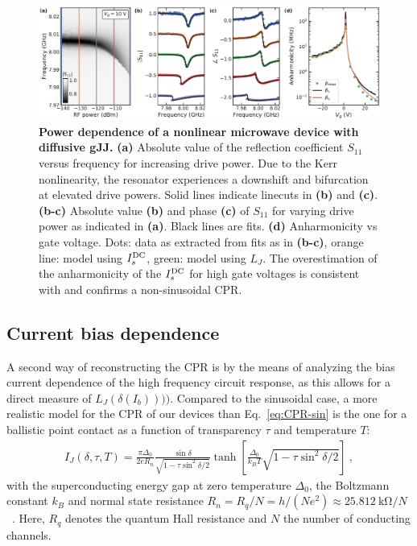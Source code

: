 \begin{figure}
	\centering
	\includegraphics[width=\linewidth]{chapter-gJJ-CPR/figs/Figure4}
	\caption{
		\textbf{Power dependence of a nonlinear microwave device with diffusive gJJ.}
		\textbf{(a)} Absolute value of the reflection coefficient $S_{11}$ versus frequency for increasing drive power.
		Due to the Kerr nonlinearity, the resonator experiences a downshift and bifurcation at elevated drive powers.
		Solid lines indicate linecuts in \textbf{(b)} and \textbf{(c)}.
		\textbf{(b-c)} Absolute value \textbf{(b)} and phase \textbf{(c)} of $S_{11}$ for varying drive power as indicated in \textbf{(a)}.
		Black lines are fits.
		\textbf{(d)} Anharmonicity vs gate voltage.
		Dots: data as extracted from fits as in \textbf{(b-c)}, orange line: model using $I_s^{\rm DC}$, green: model using $L_J$.
		The overestimation of the anharmonicity of the $I_s^{\rm DC}$ for high gate voltages is consistent with and confirms a non-sinusoidal CPR.
	}
	\label{fig:figure4}
\end{figure}

\subsection{Current bias dependence}

A second way of reconstructing the CPR is by the means of analyzing the bias current dependence of the high frequency circuit response, as this allows for a direct measure of $L_J(\delta(I_b))))$.
%
Compared to the sinusoidal case, a more realistic model for the CPR of our devices than Eq.~\ref{eq:CPR-sin} is the one for a ballistic point contact as a function of transparency $\tau$ and temperature $T$:
%
\begin{align}
I_J(\delta,\tau,T) = \frac{\pi\Delta_0}{2 e R_n} \frac{\sin\delta}{\sqrt{1 - \tau \sin^2\delta / 2}} \tanh\left[\frac{\Delta_0}{k_B T} \sqrt{1 - \tau \sin^2\delta / 2}\right]\ ,
\label{eq:CPR-ball}
\end{align}
%
with the superconducting energy gap at zero temperature $\Delta_0$, the Boltzmann constant $k_B$ and normal state resistance $R_n= R_q/N = h/(Ne^2)\approx \SI{25.812}{\kilo\ohm} / N$~\cite{golubovCurrentphaseRelationJosephson2004a}.
%
Here, $R_q$ denotes the quantum Hall resistance and $N$ the number of conducting channels.


